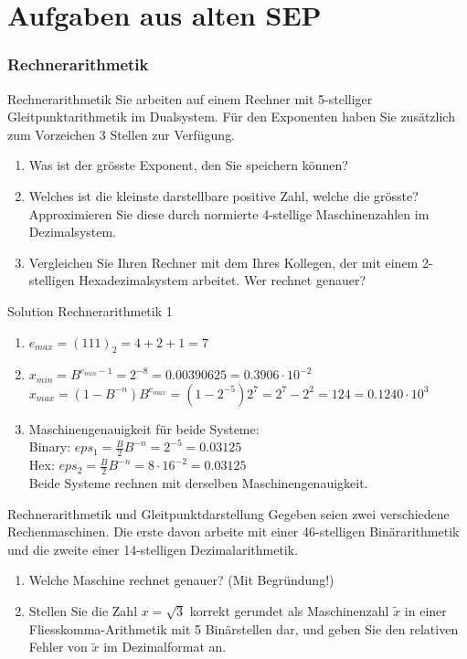 \section{Aufgaben aus alten SEP}

\subsubsection{Rechnerarithmetik}

\begin{example2}{Rechnerarithmetik}
Sie arbeiten auf einem Rechner mit 5-stelliger Gleitpunktarithmetik im Dualsystem. Für den Exponenten haben Sie zusätzlich zum Vorzeichen 3 Stellen zur Verfügung.
\begin{enumerate}
    \item Was ist der grösste Exponent, den Sie speichern können?
    \item Welches ist die kleinste darstellbare positive Zahl, welche die grösste? Approximieren Sie diese durch normierte 4-stellige Maschinenzahlen im Dezimalsystem.
    \item Vergleichen Sie Ihren Rechner mit dem Ihres Kollegen, der mit einem 2-stelligen Hexadezimalsystem arbeitet. Wer rechnet genauer?
\end{enumerate}
\end{example2}

\begin{KR}{Solution Rechnerarithmetik 1}
\begin{enumerate}
    \item $e_{max} = (111)_2 = 4 + 2 + 1 = 7$
    
    \item $x_{min} = B^{e_{min}-1} = 2^{-8} = 0.00390625 = 0.3906 \cdot 10^{-2}$\\
    $x_{max} = (1-B^{-n})B^{e_{max}} = (1-2^{-5})2^7 = 2^7 - 2^2 = 124 = 0.1240 \cdot 10^3$
    
    \item Maschinengenauigkeit für beide Systeme:\\
    Binary: $eps_1 = \frac{B}{2}B^{-n} = 2^{-5} = 0.03125$\\
    Hex: $eps_2 = \frac{B}{2}B^{-n} = 8 \cdot 16^{-2} = 0.03125$\\
    Beide Systeme rechnen mit derselben Maschinengenauigkeit.
\end{enumerate}
\end{KR}

\begin{example2}{Rechnerarithmetik und Gleitpunktdarstellung}
Gegeben seien zwei verschiedene Rechenmaschinen. Die erste davon arbeite mit einer 46-stelligen Binärarithmetik und die zweite einer 14-stelligen Dezimalarithmetik.
\begin{enumerate}
    \item Welche Maschine rechnet genauer? (Mit Begründung!)
    \item Stellen Sie die Zahl $x = \sqrt{3}$ korrekt gerundet als Maschinenzahl $\tilde{x}$ in einer Fliesskomma-Arithmetik mit 5 Binärstellen dar, und geben Sie den relativen Fehler von $\tilde{x}$ im Dezimalformat an.
\end{enumerate}
\end{example2}

